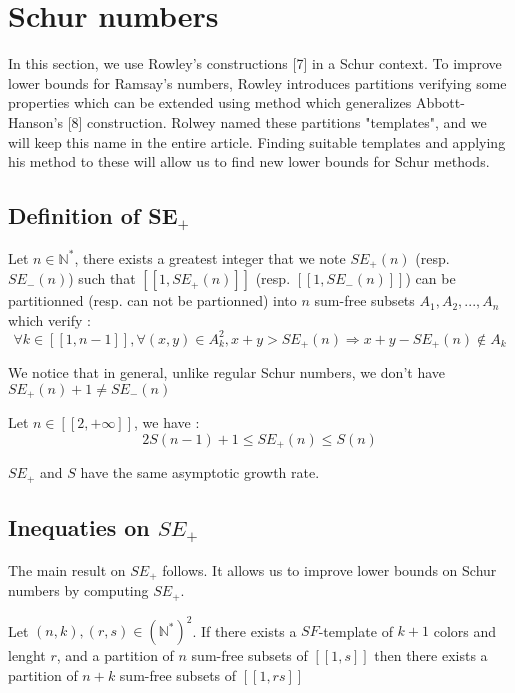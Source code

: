 \section{Schur numbers}

\qquad In this section, we use Rowley's constructions [7] in a Schur context. To improve lower bounds for Ramsay's numbers, Rowley 
introduces partitions verifying some properties which can be extended using method which generalizes Abbott-Hanson's [8] construction. 
Rolwey named these partitions "templates", and we will keep this name in the entire article. Finding suitable templates and applying his 
method to these will allow us to find new lower bounds for Schur methods.

\subsection{Definition of SE\(_+\)}

\begin{definition}
	Let \( n \in \mathbb{N}^*\), there exists a greatest integer that we note \(SE_+(n)\) (resp. \(SE_-(n)\)) such that \( [\![1, SE_+(n)]\!]\) 
	(resp. \( [\![1, SE_-(n)]\!]\)) can be partitionned (resp. can not be partionned) into \(n\) sum-free subsets \(A_1, A_2, ..., A_n\) which verify :
	\[
	\forall k \in [\![1, n-1]\!], \forall (x,y) \in A_k^2, x+y > SE_+(n)
	\Longrightarrow x+y-SE_+(n) \notin A_k
	\]
\end{definition}
We notice that in general, unlike regular Schur numbers, we don't have \(SE_+(n) + 1 \neq SE_-(n)\)

\begin{theorem}
	Let \(n \in [\![2, +\infty]\!]\), we have :
	\[
	2S(n-1)+1 \leqslant SE_+(n) \leqslant S(n)
	\]
\end{theorem}

\begin{remark}
	\(SE_+\) and \(S\) have the same asymptotic growth rate.
\end{remark}


\subsection{Inequaties on \(SE_+\)} 

The main result on \(SE_+\) follows. It allows us to improve lower bounds on Schur numbers by computing \(SE_+\).

\begin{theorem}
	Let $(n,k), (r,s) \in (\mathbb{N}^*)^2$. If there exists a \(SF\)-template of $k+1$ colors and lenght \(r\),
	and a partition of $n$ sum-free subsets of $[\![1,s]\!]$ then there exists a partition of $n+k$ sum-free subsets of $[\![1,rs]\!]$
\end{theorem}

